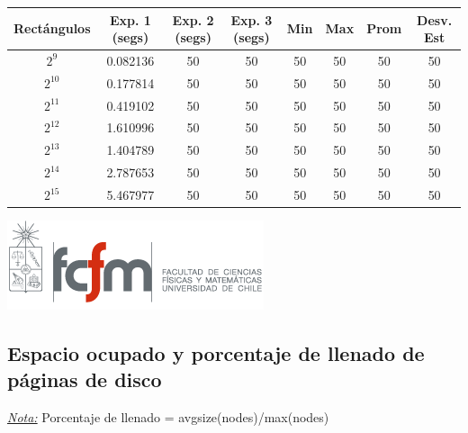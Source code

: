 \documentclass[letterpaper,10pt]{article}
\begin{document}
	\begin{center}

		\begin{tabular}{|c|c|c|c|c|c|c|c|}
			\hline
			Rectángulos	& Exp. 1 (segs) & Exp. 2 (segs) & Exp. 3 (segs) & Min & Max & Prom & Desv. Est\\
			\hline
			$2^{9}$ 	& 0.082136 & 50 	& 50 	& 50 	& 50 	& 50 	& 50 \\
			\hline
			$2^{10}$ 	& 0.177814 & 50 	& 50 	& 50 	& 50 	& 50 	& 50 \\
			\hline
			$2^{11}$ 	& 0.419102 & 50 	& 50 	& 50 	& 50 	& 50 	& 50 \\
			\hline
			$2^{12}$ 	& 1.610996 & 50 	& 50 	& 50 	& 50 	& 50 	& 50 \\
			\hline
			$2^{13}$ 	& 1.404789 & 50 	& 50 	& 50 	& 50 	& 50 	& 50 \\
			\hline
			$2^{14}$ 	& 2.787653 & 50 	& 50 	& 50 	& 50 	& 50 	& 50 \\
			\hline
			$2^{15}$ 	& 5.467977 & 50 	& 50 	& 50 	& 50 	& 50 	& 50 \\
			\hline
		\end{tabular}

		\includegraphics{logoFCFM.png}
	\end{center}

	\subsection{Espacio ocupado y porcentaje de llenado de páginas de disco}

	\underline{\textit{Nota:}} Porcentaje de llenado = avgsize(nodes)/max(nodes)
\end{document}
